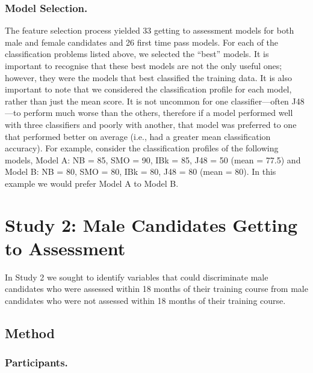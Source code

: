 \documentclass[
  12pt,
  a4paper,
]{book}
\begin{document}
\hypertarget{model-selection.}{%
\subsubsection{Model Selection.}\label{model-selection.}}

The feature selection process yielded 33 getting to assessment models for both male and female candidates and 26 first time pass models. For each of the classification problems listed above, we selected the ``best'' models. It is important to recognise that these best models are not the only useful ones; however, they were the models that best classified the training data. It is also important to note that we considered the classification profile for each model, rather than just the mean score. It is not uncommon for one classifier---often J48---to perform much worse than the others, therefore if a model performed well with three classifiers and poorly with another, that model was preferred to one that performed better on average (i.e., had a greater mean classification accuracy). For example, consider the classification profiles of the following models, Model A: NB = 85, SMO = 90, IBk = 85, J48 = 50 (mean = 77.5) and Model B: NB = 80, SMO = 80, IBk = 80, J48 = 80 (mean = 80). In this example we would prefer Model A to Model B.

\hypertarget{male-gta}{%
\section{Study 2: Male Candidates Getting to Assessment}\label{male-gta}}

In Study 2 we sought to identify variables that could discriminate male candidates who were assessed within 18 months of their training course from male candidates who were not assessed within 18 months of their training course.

\hypertarget{male-gta-method}{%
\subsection{Method}\label{male-gta-method}}

\hypertarget{male-gta-participants}{%
\subsubsection{Participants.}\label{male-gta-participants}}
\end{document}

